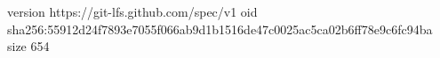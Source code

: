 version https://git-lfs.github.com/spec/v1
oid sha256:55912d24f7893e7055f066ab9d1b1516de47c0025ac5ca02b6ff78e9c6fc94ba
size 654
